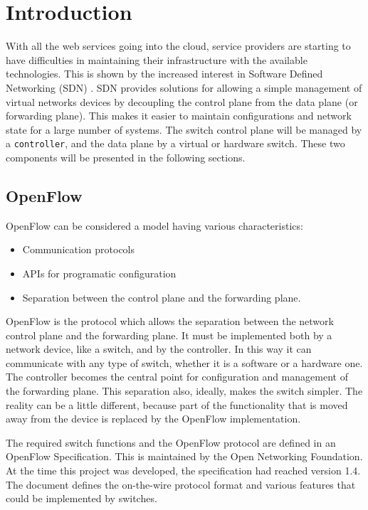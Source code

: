\chapter{Introduction}
\label{chapter:intro}

With all the web services going into the cloud\cite{gartner}, service providers are starting to
have difficulties in maintaining their infrastructure with the available technologies.
This is shown by the increased interest in Software Defined Networking (SDN) \cite{sdn:whitepapers}.
SDN provides solutions for allowing a simple management of virtual networks devices by decoupling the control
plane from the data plane (or forwarding plane). This makes it easier to maintain configurations and network state
for a large number of systems. The switch control plane will be managed by a \texttt{controller},
and the data plane by a virtual or hardware switch. These two components will be presented in the following
sections.

\section{OpenFlow}

OpenFlow can be considered a model\cite{sdn} having various characteristics:
\begin{itemize}
 \item Communication protocols
 \item APIs for programatic configuration
 \item Separation between the control plane and the forwarding plane.
\end{itemize}

OpenFlow is the protocol which allows the separation between the network control plane and the forwarding plane.
It must be implemented both by a network device, like a switch, and by the controller. In this way it 
can communicate with any type of switch, whether it is a software or a hardware one. The controller becomes
the central point for configuration and management of the forwarding plane. This separation also, ideally, makes the
switch simpler. The reality can be a little different, because part of the functionality that is moved away from
the device is replaced by the OpenFlow implementation.

The required switch functions and the OpenFlow protocol are defined in an OpenFlow Specification.
This is maintained by the Open Networking Foundation\cite{onf}. At the time this project was developed, the specification
had reached version 1.4. The document defines the on-the-wire protocol format and various features that could
be implemented by switches.

